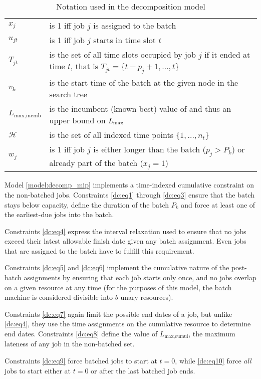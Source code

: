 \begin{table}[h]
\begin{tabular}{l p{5in}}
$x_j$ & is 1 iff job $j$ is assigned to the batch \\
$u_{jt}$ & is 1 iff job $j$ starts in time slot $t$ \\
$T_{jt}$ & is the set of all time slots occupied by job $j$ if it ended at time
$t$, that is $T_{jt} = \{t - p_j + 1, \dots, t\}$ \\
$v_k$ & is the start time of the batch at the given node in the search tree \\
$L_{\text{max,incmb}}$ & is the incumbent (known best) value of and thus an
upper bound on $L_{\text{max}}$ \\
$\mathcal{H}$ & is the set of all indexed time points $\{1, \dots, n_t\}$ \\
$w_j$ & is 1 iff job $j$ is either longer than the batch ($p_j > P_k$) or
already part of the batch ($x_j = 1$)
\end{tabular}
\caption{Notation used in the decomposition model}
\end{table}

Model \ref{model:decomp_mip} implements a time-indexed cumulative constraint on the
non-batched jobs. Constraints \eqref{dc:eq1} through \eqref{dc:eq3} ensure that the
batch stays below capacity, define the duration of the batch $P_k$ and force at
least one of the earliest-due jobs into the batch.

Constraints \eqref{dc:eq4} express the interval relaxation used to ensure that no
jobs exceed their latest allowable finish date given any batch assignment. Even
jobs that are assigned to the batch have to fulfill this requirement.

Constraints \eqref{dc:eq5} and \eqref{dc:eq6} implement the cumulative nature of the
post-batch assignments by ensuring that each job starts only once, and no jobs
overlap on a given resource at any time (for the purposes of this model, the
batch machine is considered divisible into $b$ unary resources).

Constraints \eqref{dc:eq7} again limit the possible end dates of a
job, but unlike \eqref{dc:eq4}, they use the time assignments on the cumulative
resource to determine end dates. Constraints \eqref{dc:eq8} define the value of
$L_{\text{max,cumul}}$, the maximum lateness of any job in the non-batched set.

Constraints \eqref{dc:eq9} force batched jobs to start at $t = 0$, while \eqref{dc:eq10} force \textit{all} jobs to start either at $t = 0$ or after the last batched job ends.

